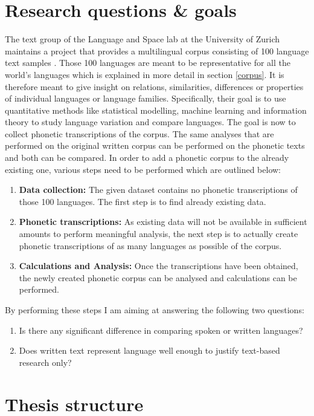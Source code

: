 \section{Research questions \& goals}
The text group of the Language and Space lab at the University of Zurich maintains a project that provides a multilingual corpus consisting of 100 language text samples \citep{UniversityofZurich.19.07.2021}. Those 100 languages are meant to be representative for all the world's languages which is explained in more detail in section \ref{corpus}. It is therefore meant to give insight on relations, similarities, differences or properties of individual languages or language families. Specifically, their goal is to use quantitative methods like statistical modelling, machine learning and information theory to study language variation and compare languages. The goal is now to collect phonetic transcriptions of the corpus. The same analyses that are performed on the original written corpus can be performed on the phonetic texts and both can be compared. In order to add a phonetic corpus to the already existing one, various steps need to be performed which are outlined below:
\begin{enumerate}
 \item \textbf{Data collection:} The given dataset contains no phonetic transcriptions of those 100 languages. The first step is to find already existing data. 
 \item \textbf{Phonetic transcriptions:} As existing data will not be available in sufficient amounts to perform meaningful analysis, the next step is to actually create phonetic transcriptions of as many languages as possible of the corpus. 
 \item \textbf{Calculations and Analysis:} Once the transcriptions have been obtained, the newly created phonetic corpus can be analysed and calculations can be performed.
\end{enumerate}

By performing these steps I am aiming at answering the following two questions:

\begin{enumerate}
\item Is there any significant difference in comparing spoken or written languages?
\item Does written text represent language well enough to justify text-based research only?
\end{enumerate}

\section{Thesis structure}

